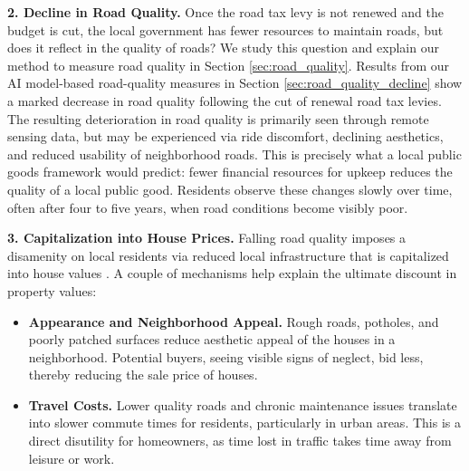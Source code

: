 
\noindent
{\bf 2. Decline in Road Quality.} Once the road tax levy is not renewed and the budget is cut, the local government has fewer resources to maintain roads, but does it reflect in the quality of roads? We study this question and explain our method to measure road quality in Section \ref{sec:road_quality}. Results from our AI model-based road-quality measures in Section \ref{sec:road_quality_decline} show a marked decrease in road quality following the cut of renewal road tax levies. The resulting deterioration in road quality is primarily seen through remote sensing data, but may be experienced via ride discomfort, declining aesthetics, and reduced usability of neighborhood roads. This is precisely what a local public goods framework would predict: fewer financial resources for upkeep reduces the quality of a local public good. Residents observe these changes slowly over time, often after four to five years, when road conditions become visibly poor.

\noindent
{\bf 3. Capitalization into House Prices.} Falling road quality imposes a disamenity on local residents via reduced local infrastructure that is capitalized into house values \citep{Oates1969}. A couple of mechanisms help explain the ultimate discount in property values:

\begin{itemize}
    \item \textbf{Appearance and Neighborhood Appeal.} Rough roads, potholes, and poorly patched surfaces reduce aesthetic appeal of the houses in a neighborhood. Potential buyers, seeing visible signs of neglect, bid less, thereby reducing the sale price of houses. 
    \item \textbf{Travel Costs.} Lower quality roads and chronic maintenance issues translate into slower commute times for residents, particularly in urban areas. This is a direct disutility for homeowners, as time lost in traffic takes time away from leisure or work.
\end{itemize}

